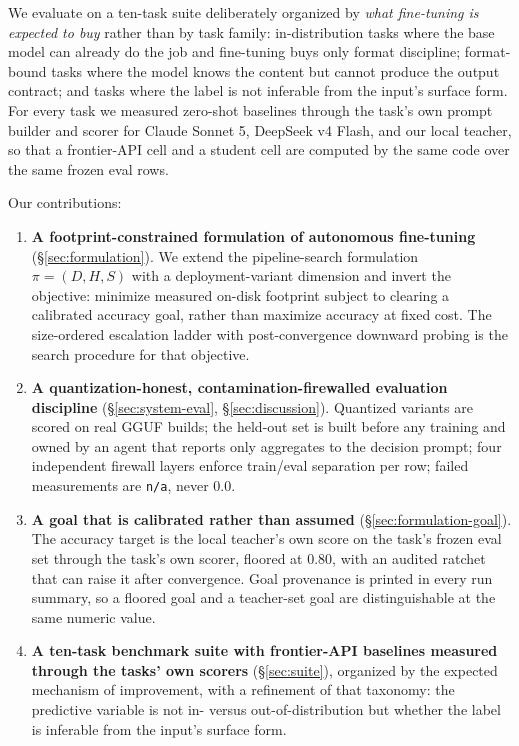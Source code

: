 \documentclass[sigconf,10pt]{acmart}
\newcommand{\xref}[1]{\S\ref{#1}}
\begin{document}
We evaluate on a ten-task suite deliberately organized by \emph{what fine-tuning is expected
to buy} rather than by task family: in-distribution tasks where the base model can already
do the job and fine-tuning buys only format discipline; format-bound tasks where the model
knows the content but cannot produce the output contract; and tasks where the label is not
inferable from the input's surface form. For every task we measured zero-shot baselines
through the task's own prompt builder and scorer for Claude Sonnet 5, DeepSeek v4 Flash, and
our local teacher, so that a frontier-API cell and a student cell are computed by the same
code over the same frozen eval rows.

Our contributions:

\begin{enumerate}[leftmargin=*,itemsep=2pt]
\item \textbf{A footprint-constrained formulation of autonomous fine-tuning} (\xref{sec:formulation}).
We extend the pipeline-search formulation $\pi=(D,H,S)$ with a deployment-variant dimension
and invert the objective: minimize measured on-disk footprint subject to clearing a
calibrated accuracy goal, rather than maximize accuracy at fixed cost. The size-ordered
escalation ladder with post-convergence downward probing is the search procedure for that
objective.

\item \textbf{A quantization-honest, contamination-firewalled evaluation discipline}
(\xref{sec:system-eval}, \xref{sec:discussion}). Quantized variants are scored on real GGUF
builds; the held-out set is built before any training and owned by an agent that reports only
aggregates to the decision prompt; four independent firewall layers enforce train/eval
separation per row; failed measurements are \texttt{n/a}, never $0.0$.

\item \textbf{A goal that is calibrated rather than assumed} (\xref{sec:formulation-goal}).
The accuracy target is the local teacher's own score on the task's frozen eval set through
the task's own scorer, floored at $0.80$, with an audited ratchet that can raise it after
convergence. Goal provenance is printed in every run summary, so a floored goal and a
teacher-set goal are distinguishable at the same numeric value.

\item \textbf{A ten-task benchmark suite with frontier-API baselines measured through the
tasks' own scorers} (\xref{sec:suite}), organized by the expected mechanism of improvement,
with a refinement of that taxonomy: the predictive variable is not in- versus
out-of-distribution but whether the label is inferable from the input's surface form.


\end{enumerate}
\end{document}
